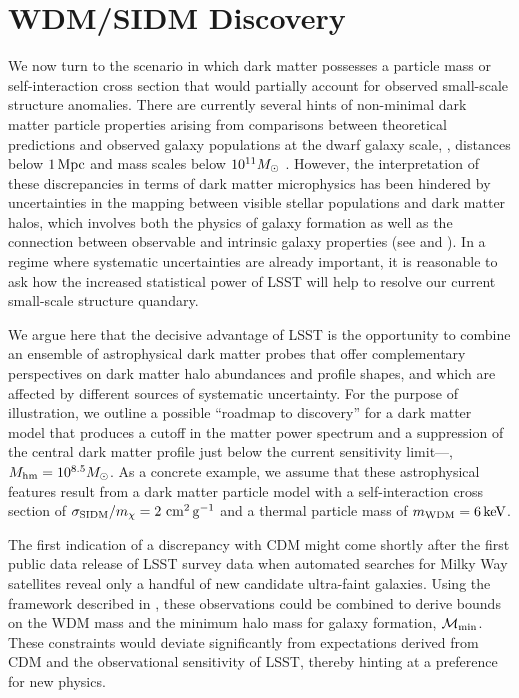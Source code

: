 \section{WDM/SIDM Discovery}
\label{sec:wdm_sidm_discovery}

We now turn to the scenario in which dark matter possesses a particle mass or self-interaction cross section that would partially account for observed small-scale structure anomalies.
There are currently several hints of non-minimal dark matter particle properties arising from comparisons between theoretical predictions and observed galaxy populations at the dwarf galaxy scale, \ie, distances below $1 \mathrm{\,Mpc}$ and mass scales below $10^{11} M_\odot$ \citep[reviewed by][]{BuckleyPeter:2017,Bullock:2017}.
However, the interpretation of these discrepancies in terms of dark matter microphysics has been hindered by uncertainties in the mapping between visible stellar populations and dark matter halos, which involves both the physics of galaxy formation as well as the connection between observable and intrinsic galaxy properties (see  and ).
In a regime where systematic uncertainties are already important, it is reasonable to ask how the increased statistical power of LSST will help to resolve our current small-scale structure quandary.

We argue here that the decisive advantage of LSST is the opportunity to combine an ensemble of astrophysical dark matter probes that offer complementary perspectives on dark matter halo abundances and profile shapes, and which are affected by different sources of systematic uncertainty.
For the purpose of illustration, we outline a possible ``roadmap to discovery'' for a dark matter model that produces a cutoff in the matter power spectrum and a suppression of the central dark matter profile just below the current sensitivity limit---\ie, $M_{\rm hm} = 10^{8.5}M_\odot$.
As a concrete example, we assume that these astrophysical features result from a dark matter particle model with a self-interaction cross section of $\sigma_{\rm SIDM}/m_\chi = 2 \mathrm{\,\mathrm{\,cm}^2\mathrm{\,g}^{-1}}$ and a thermal particle mass of $m_{\rm WDM} = 6 \mathrm{\,keV}$.

The first indication of a discrepancy with CDM might come shortly after the first public data release of LSST survey data when automated searches for Milky Way satellites reveal only a handful of new candidate ultra-faint galaxies. 
Using the framework described in , these observations could be combined to derive bounds on the WDM mass and the minimum halo mass for galaxy formation, $\mathcal{M}_{\rm min}$. These constraints would deviate significantly from expectations derived from CDM and the observational sensitivity of LSST, thereby hinting at a preference for new physics.

